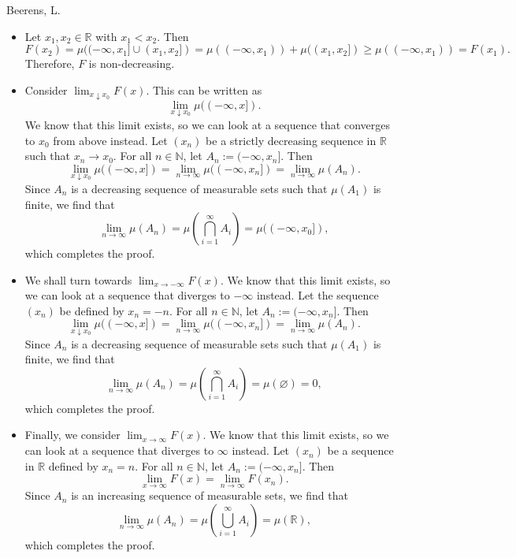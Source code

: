 \begin{solution}[3.11]{Beerens, L.}
    \begin{itemize}
        \item Let $x_1,x_2\in\mathbb{R}$ with $x_1<x_2$. Then
        $$
            F(x_2) = \mu((-\infty,x_1]\cup (x_1,x_2]) = \mu((-\infty, x_1)) + \mu((x_1,x_2])\geq\mu((-\infty, x_1)) = F(x_1).
        $$
        Therefore, $F$ is non-decreasing.
        
        \item Consider $\lim_{x\downarrow x_0}F(x)$. This can be written as 
        $$
            \lim_{x\downarrow x_0}\mu((-\infty,x]).
        $$
        We know that this limit exists, so we can look at a sequence that converges to $x_0$ from above instead. Let $(x_n)$ be a strictly decreasing sequence in $\mathbb{R}$ such that $x_n\rightarrow x_0$. For all $n\in\mathbb{N}$, let $A_n:=(-\infty,x_n]$. Then
        $$
            \lim_{x\downarrow x_0}\mu((-\infty,x]) = \lim_{n\rightarrow \infty}\mu((-\infty,x_n]) = \lim_{n\rightarrow \infty}\mu(A_n).
        $$
        Since $A_n$ is a decreasing sequence of measurable sets such that $\mu(A_1)$ is finite, we find that
        $$
            \lim_{n\rightarrow \infty}\mu(A_n) = \mu\left( \bigcap_{i=1}^\infty A_i \right) = \mu((-\infty, x_0]),
        $$
        which completes the proof.
        
        \item We shall turn towards $\lim_{x\rightarrow -\infty}F(x)$. We know that this limit exists, so we can look at a sequence that diverges to $-\infty$ instead. Let the sequence $(x_n)$ be defined by $x_n = -n$. For all $n\in\mathbb{N}$, let $A_n:=(-\infty,x_n]$. Then
        $$
            \lim_{x\downarrow x_0}\mu((-\infty,x]) = \lim_{n\rightarrow \infty}\mu((-\infty,x_n]) = \lim_{n\rightarrow \infty}\mu(A_n).
        $$
        Since $A_n$ is a decreasing sequence of measurable sets such that $\mu(A_1)$ is finite, we find that
        $$
            \lim_{n\rightarrow \infty}\mu(A_n) = \mu\left( \bigcap_{i=1}^\infty A_i \right) = \mu(\varnothing) = 0,
        $$
        which completes the proof.
        
        \item Finally, we consider $\lim_{x\rightarrow \infty}F(x)$. We know that this limit exists, so we can look at a sequence that diverges to $\infty$ instead. Let $(x_n)$ be a sequence in $\mathbb{R}$ defined by $x_n = n$. For all $n\in\mathbb{N}$, let $A_n:=(-\infty,x_n]$. Then
        $$
            \lim_{x\rightarrow \infty}F(x) = \lim_{n\rightarrow \infty}F(x_n).
        $$
        Since $A_n$ is an increasing sequence of measurable sets, we find that
        $$
            \lim_{n\rightarrow \infty}\mu(A_n) = \mu\left( \bigcup_{i=1}^\infty A_i \right) = \mu(\mathbb{R}),
        $$
        which completes the proof.
    \end{itemize}
\end{solution}
